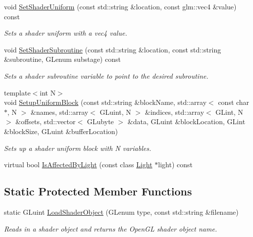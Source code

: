 \begin{DoxyCompactItemize}
void \hyperlink{class_shader_program_a5138c3a38a576bbb90d37ab8be6395bf}{Set\+Shader\+Uniform} (const std\+::string \&location, const glm\+::vec4 \&value) const
\begin{DoxyCompactList}\small\item\em Sets a shader uniform with a vec4 value. \end{DoxyCompactList}\item
void \hyperlink{class_shader_program_a00815a3efc74c4ff9a12f2a0c9b46d6e}{Set\+Shader\+Subroutine} (const std\+::string \&location, const std\+::string \&subroutine, G\+Lenum substage) const
\begin{DoxyCompactList}\small\item\em Sets a shader subroutine variable to point to the desired subroutine. \end{DoxyCompactList}\item
{\footnotesize template$<$int N$>$ }\\void \hyperlink{class_shader_program_aac2a462281a872df0ed8d197ec0b4104}{Setup\+Uniform\+Block} (const std\+::string \&block\+Name, std\+::array$<$ const char $\ast$, N $>$ \&names, std\+::array$<$ G\+Luint, N $>$ \&indices, std\+::array$<$ G\+Lint, N $>$ \&offsets, std\+::vector$<$ G\+Lubyte $>$ \&data, G\+Luint \&block\+Location, G\+Lint \&block\+Size, G\+Luint \&buffer\+Location)
\begin{DoxyCompactList}\small\item\em Sets up a shader uniform block with N variables. \end{DoxyCompactList}\item
virtual bool \hyperlink{class_shader_program_a20b5ed7b5f81154025eb7b6f1be70f84}{Is\+Affected\+By\+Light} (const class \hyperlink{class_light}{Light} $\ast$light) const
\end{DoxyCompactItemize}
\subsection*{Static Protected Member Functions}
\begin{DoxyCompactItemize}
\item
static G\+Luint \hyperlink{class_shader_program_ab5c50c33203cf65b7f6ffe00d2243d5a}{Load\+Shader\+Object} (G\+Lenum type, const std\+::string \&filename)
\begin{DoxyCompactList}\small\item\em Reads in a shader object and returns the Open\+GL shader object name. \end{DoxyCompactList}\end{DoxyCompactItemize}

